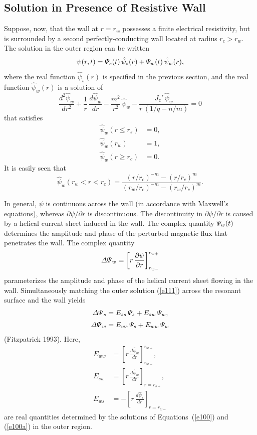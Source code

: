 \documentclass[notitlepage,12pt]{article}
\begin{document}
\subsection{Solution in Presence of Resistive Wall}\label{resistive}
Suppose, now, that the wall at $r=r_w$ possesses a finite electrical resistivity, but is surrounded by a second perfectly-conducting wall
located at radius $r_c>r_w$.
The solution in the outer region can be written
\begin{equation}\label{e111}
\psi(r,t) = {\mit\Psi}_s(t)\,\hat{\psi}_s(r) + {\mit\Psi}_w(t)\,\hat{\psi}_w(r),
\end{equation}
where the real function $\hat{\psi}_s(r)$ is specified in the previous section, and the real function  $\hat{\psi}_w(r)$ is a solution of 
\begin{equation}\label{e100a}
\frac{d^2\hat{\psi}_w}{dr^2} + \frac{1}{r}\,\frac{d\hat{\psi}_w}{dr}-\frac{m^2}{r^2}\,\hat{\psi}_w - \frac{J_z'\,\hat{\psi}_w}{r\,(1/q-n/m)}= 0
\end{equation}
that satisfies
\begin{align}\label{e101a}
\hat{\psi}_w(r\leq r_s) &= 0,\\[0.5ex]
\hat{\psi}_w(r_w) &= 1,\label{e102a}\\[0.5ex]
\hat{\psi}_w(r\geq r_c) &= 0.\label{e103a}
\end{align}
It is easily seen that
\begin{equation}\label{e117}
\hat{\psi}_w(r_w< r < r_c) = \frac{(r/r_c)^{-m} - (r/r_c)^m}{(r_w/r_c)^{-m} - (r_w/r_c)^m}.
\end{equation}

In general, $\psi$ is continuous across the wall (in accordance with Maxwell's equations), whereas $\partial\psi/\partial r$ is discontinuous. The discontinuity in $\partial\psi/\partial r$ is caused by a helical current sheet induced in the wall. The complex quantity ${\mit\Psi}_w(t)$ determines the amplitude and
phase of the perturbed magnetic flux that penetrates the wall. The complex quantity
\begin{equation}\label{e118}
{\mit\Delta\Psi}_w = \left[r\,\frac{\partial\psi}{\partial r}\right]_{r_{w-}}^{r_{w+}}
\end{equation}
parameterizes the amplitude and phase of the helical current sheet flowing in the wall.
Simultaneously matching the outer solution (\ref{e111}) across the resonant surface and the wall yields
\begin{align}
{\mit\Delta\Psi}_s &= E_{ss}\,{\mit\Psi}_s + E_{sw}\,{\mit\Psi}_w,\\[0.5ex]
{\mit\Delta\Psi}_w &= E_{ws}\,{\mit\Psi}_s+ E_{ww}\,{\mit\Psi}_w
\end{align}
(Fitzpatrick 1993).
Here,
\begin{align}
E_{ww}&= \left[r\,\frac{d\hat{\psi}_w}{dr}\right]_{r_{w-}}^{r_{w+}},\\[0.5ex]
E_{sw} &=\left[r\,\frac{{d\hat\psi}_w}{dr}\right]_{r=r_{s+}},\label{e121}\\[0.5ex]
E_{ws} &=-\left[r\,\frac{{d\hat\psi}_s}{dr}\right]_{r=r_{w-}}\label{e122}
\end{align}
are real quantities determined by the solutions of Equations~(\ref{e100}) and (\ref{e100a}) in the outer region.
\end{document}
